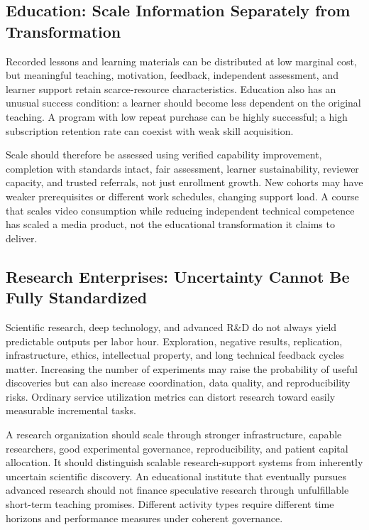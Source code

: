 \subsection{Education: Scale Information Separately from Transformation}
\label{sec:education_information_vs_transformation}

Recorded lessons and learning materials can be distributed at low marginal cost, but meaningful teaching, motivation, feedback, independent assessment, and learner support retain scarce-resource characteristics. Education also has an unusual success condition: a learner should become less dependent on the original teaching. A program with low repeat purchase can be highly successful; a high subscription retention rate can coexist with weak skill acquisition.

Scale should therefore be assessed using verified capability improvement, completion with standards intact, fair assessment, learner sustainability, reviewer capacity, and trusted referrals, not just enrollment growth. New cohorts may have weaker prerequisites or different work schedules, changing support load. A course that scales video consumption while reducing independent technical competence has scaled a media product, not the educational transformation it claims to deliver.

\subsection{Research Enterprises: Uncertainty Cannot Be Fully Standardized}
\label{sec:research_enterprises_uncertainty}

Scientific research, deep technology, and advanced R\&D do not always yield predictable outputs per labor hour. Exploration, negative results, replication, infrastructure, ethics, intellectual property, and long technical feedback cycles matter. Increasing the number of experiments may raise the probability of useful discoveries but can also increase coordination, data quality, and reproducibility risks. Ordinary service utilization metrics can distort research toward easily measurable incremental tasks.

A research organization should scale through stronger infrastructure, capable researchers, good experimental governance, reproducibility, and patient capital allocation. It should distinguish scalable research-support systems from inherently uncertain scientific discovery. An educational institute that eventually pursues advanced research should not finance speculative research through unfulfillable short-term teaching promises. Different activity types require different time horizons and performance measures under coherent governance.


